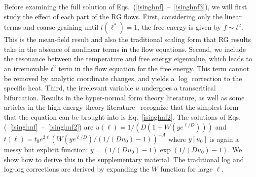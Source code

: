 \documentclass[
 reprint,
 amsmath,amssymb,
 aps, superscriptaddress, pre
]{revtex4-1}
\begin{document}
Before examining the full solution
of Eqs.~(\ref{isinghnf}~--~\ref{isinghnf3}), we will first study the effect
of each part of the RG flows. First, considering only the linear terms and
coarse-graining until $t(\ell^*) = 1$, the free energy is given by 
$f \sim t^2$. This is the mean-field result and also the traditional scaling
form that RG results take in the absence of nonlinear terms in the flow
equations. Second, we include the resonance between the temperature and
free energy eigenvalue, which leads to an irremovable $t^2$ term in
the flow equation for the free energy. This term cannot be removed by analytic
coordinate changes, and yields a $\log$ correction to the specific heat.
Third, the irrelevant variable $u$ undergoes a transcritical
bifurcation. Results in the hyper-normal form theory literature, as well
as some articles in the high-energy theory
literature~\cite{sonoda,magradze} recognize that the simplest form that 
the equation can be brought into is Eq.~\ref{isinghnf2}.  The solutions
of Eqs.(~\ref{isinghnf}~--~\ref{isinghnf2}) are $u(\ell) = 1 /(D (1 + W(y e^{\ell/D})))$ and
$t(\ell) = t_0 e^{2 \ell} (W(y e^{ \ell/D})/(1/(D u_0) - 1))^{-A}$  where $y[u_0]$ is again
a messy but explicit function: $y = (1/(D u_0)-1) \exp(1/(D u_0)-1)$. We show how to derive this in the supplementary material. 
The traditional log and log-log corrections are
derived by expanding the $W$ function for large $\ell$.
\end{document}
